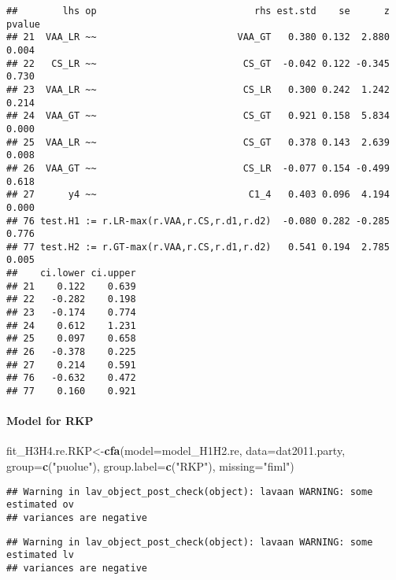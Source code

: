\documentclass[
]{article}
\newenvironment{Shaded}{\begin{snugshade}}{\end{snugshade}}
\newcommand{\DataTypeTok}[1]{\textcolor[rgb]{0.13,0.29,0.53}{#1}}
\newcommand{\KeywordTok}[1]{\textcolor[rgb]{0.13,0.29,0.53}{\textbf{#1}}}
\newcommand{\NormalTok}[1]{#1}
\newcommand{\StringTok}[1]{\textcolor[rgb]{0.31,0.60,0.02}{#1}}
\begin{document}
\begin{verbatim}
##        lhs op                            rhs est.std    se      z pvalue
## 21  VAA_LR ~~                         VAA_GT   0.380 0.132  2.880  0.004
## 22   CS_LR ~~                          CS_GT  -0.042 0.122 -0.345  0.730
## 23  VAA_LR ~~                          CS_LR   0.300 0.242  1.242  0.214
## 24  VAA_GT ~~                          CS_GT   0.921 0.158  5.834  0.000
## 25  VAA_LR ~~                          CS_GT   0.378 0.143  2.639  0.008
## 26  VAA_GT ~~                          CS_LR  -0.077 0.154 -0.499  0.618
## 27      y4 ~~                           C1_4   0.403 0.096  4.194  0.000
## 76 test.H1 := r.LR-max(r.VAA,r.CS,r.d1,r.d2)  -0.080 0.282 -0.285  0.776
## 77 test.H2 := r.GT-max(r.VAA,r.CS,r.d1,r.d2)   0.541 0.194  2.785  0.005
##    ci.lower ci.upper
## 21    0.122    0.639
## 22   -0.282    0.198
## 23   -0.174    0.774
## 24    0.612    1.231
## 25    0.097    0.658
## 26   -0.378    0.225
## 27    0.214    0.591
## 76   -0.632    0.472
## 77    0.160    0.921
\end{verbatim}

\newpage

\hypertarget{model-for-rkp}{%
\paragraph{Model for RKP}\label{model-for-rkp}}

\begin{Shaded}
\begin{Highlighting}[]
\NormalTok{fit_H3H4.re.RKP<-}\KeywordTok{cfa}\NormalTok{(}\DataTypeTok{model=}\NormalTok{model_H1H2.re,}
                    \DataTypeTok{data=}\NormalTok{dat2011.party,}
                    \DataTypeTok{group=}\KeywordTok{c}\NormalTok{(}\StringTok{"puolue"}\NormalTok{),}
                    \DataTypeTok{group.label=}\KeywordTok{c}\NormalTok{(}\StringTok{"RKP"}\NormalTok{),}
                    \DataTypeTok{missing=}\StringTok{"fiml"}\NormalTok{)}
\end{Highlighting}
\end{Shaded}

\begin{verbatim}
## Warning in lav_object_post_check(object): lavaan WARNING: some estimated ov
## variances are negative
\end{verbatim}

\begin{verbatim}
## Warning in lav_object_post_check(object): lavaan WARNING: some estimated lv
## variances are negative
\end{verbatim}
\end{document}

